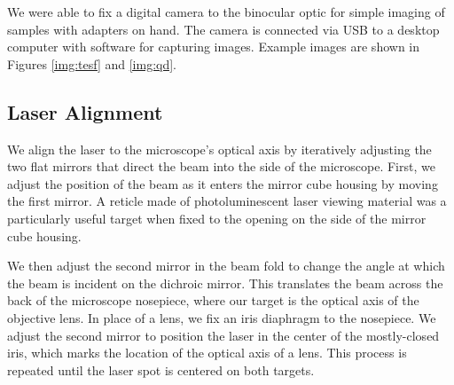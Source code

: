 We were able to fix a digital camera to the binocular optic for simple imaging of samples with adapters on hand. The camera is connected via USB to a desktop computer with software for capturing images. Example images are shown in Figures \ref{img:tesf} and \ref{img:qd}.


\subsection{Laser Alignment}
We align the laser to the microscope's optical axis by iteratively adjusting the two flat mirrors that direct the beam into the side of the microscope. First, we adjust the position of the beam as it enters the mirror cube housing by moving the first mirror. A reticle made of photoluminescent laser viewing material was a particularly useful target when fixed to the opening on the side of the mirror cube housing. 

We then adjust the second mirror in the beam fold to change the angle at which the beam is incident on the dichroic mirror. This translates the beam across the back of the microscope nosepiece, where our target is the optical axis of the objective lens. In place of a lens, we fix an iris diaphragm to the nosepiece. We adjust the second mirror to position the laser in the center of the mostly-closed iris, which marks the location of the optical axis of a lens. This process is repeated until the laser spot is centered on both targets.

